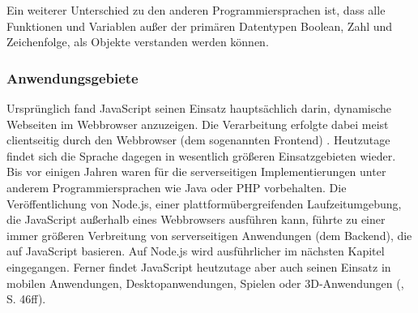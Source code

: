 \noindent
Ein weiterer Unterschied zu den anderen Programmiersprachen ist, dass alle Funktionen und Variablen außer der primären Datentypen Boolean, Zahl und Zeichenfolge, als Objekte verstanden werden können.

\subsubsection{Anwendungsgebiete}
Ursprünglich fand JavaScript seinen Einsatz hauptsächlich darin, dynamische Webseiten im Web\-browser anzuzeigen. Die Verarbeitung erfolgte dabei meist clientseitig durch den Webbrowser (dem sogenannten Frontend) \cite{JS1.3}.
\newline
\noindent
Heutzutage findet sich die Sprache dagegen in wesentlich größeren Einsatzgebieten wieder. 
Bis vor einigen Jahren waren für die serverseitigen Implementierungen unter anderem Programmiersprachen wie Java oder PHP vorbehalten. Die Veröffentlichung von Node.js, einer plattformübergreifenden Laufzeitumgebung, die JavaScript außerhalb eines Webbrowsers ausführen kann, führte zu einer immer größeren Verbreitung von serverseitigen Anwendungen (dem Backend), die auf JavaScript basieren. Auf Node.js wird ausführlicher im nächsten Kapitel eingegangen. 
Ferner findet JavaScript heutzutage aber auch seinen Einsatz in mobilen Anwendungen, Desktopanwendungen, Spielen oder 3D-Anwendungen (\cite{JS1.4}, S. 46ff).

